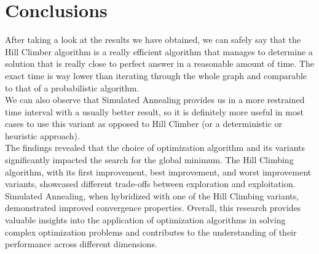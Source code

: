 \documentclass{article}
\begin{document}
\section{Conclusions}

After taking a look at the results we have obtained, we can safely say that the Hill Climber algorithm is a really efficient algorithm that manages to determine a solution that is really close to perfect answer in a reasonable amount of time. The exact time is way lower than iterating through the whole graph and comparable to that of a probabilistic algorithm.\\

We can also observe that Simulated Annealing provides us in a more restrained time interval with a usually better result, so it is definitely more useful in most cases to use this variant as opposed to Hill Climber (or a deterministic or heuristic approach).\\

The findings revealed that the choice of optimization algorithm and its variants significantly impacted the search for the global minimum. The Hill Climbing algorithm, with its first improvement, best improvement, and worst improvement variants, showcased different trade-offs between exploration and exploitation. Simulated Annealing, when hybridized with one of the Hill Climbing variants, demonstrated improved convergence properties. Overall, this research provides valuable insights into the application of optimization algorithms in solving complex optimization problems and contributes to the understanding of their performance across different dimensions.

\end{document}
